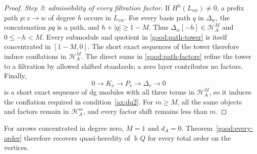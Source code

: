 \documentclass[11pt,a4paper]{article}
\renewcommand{\H}{\mathcal H}
\newcommand{\std}{\Delta}
\theoremstyle{plain}
\theoremstyle{definition}
\numberwithin{equation}{section}
\begin{document}
\begin{proof}
\noindent\textit{Step 3: admissibility of every filtration factor.}
If $H^h(L_{vw})\neq0$, a prefix path $p:v\to w$ of degree $h$
occurs in $L_{vw}$. For every basis path $q$ in $\std_w$, the
concatenation $pq$ is a path, and $h+|q|\geq1-M$.
Thus $\std_w[-h]\in\H_A^M$ and $0\leq-h<M$.
Every submodule and quotient in \eqref{good:path-tower} is itself
concentrated in $[1-M,0]$. The short exact sequences of the tower
therefore induce conflations in $\H_A^M$.
The direct sums in \eqref{good:path-factors} refine the tower to a
filtration by allowed shifted standards; a zero layer contributes
no factors. Finally,
\[
 0\longrightarrow K_v\longrightarrow P_v
 \longrightarrow\std_v\longrightarrow0
\]
is a short exact sequence of dg modules with all three terms in
$\H_A^M$, so it induces the conflation required in
condition~\ref{ax:dq2}. For $m\geq M$, all the same objects and
factors remain in $\H_A^m$, and every factor shift remains less
than $m$.
\end{proof}

For arrows concentrated in degree zero, $M=1$ and $d_A=0$.
Theorem~\ref{good:every-order} therefore recovers quasi-heredity of
$\Bbbk Q$ for every total order on the vertices.
\end{document}
